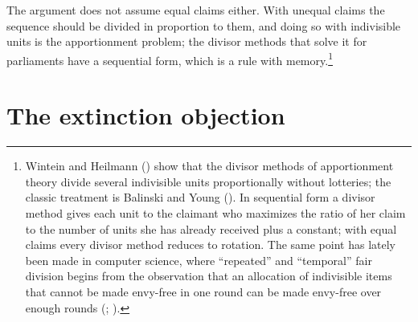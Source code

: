 \documentclass[
  11pt,
  letterpaper,
  DIV=11,
  numbers=noendperiod,
  twoside]{scrartcl}
\begin{document}
The argument does not assume equal claims either. With unequal claims
the sequence should be divided in proportion to them, and doing so with
indivisible units is the apportionment problem; the divisor methods that
solve it for parliaments have a sequential form, which is a rule with
memory.\footnote{Wintein and Heilmann
  () show that the divisor
  methods of apportionment theory divide several indivisible units
  proportionally without lotteries; the classic treatment is Balinski
  and Young (). In sequential form
  a divisor method gives each unit to the claimant who maximizes the
  ratio of her claim to the number of units she has already received
  plus a constant; with equal claims every divisor method reduces to
  rotation. The same point has lately been made in computer science,
  where ``repeated'' and ``temporal'' fair division begins from the
  observation that an allocation of indivisible items that cannot be
  made envy-free in one round can be made envy-free over enough rounds
  (;
  ).}

\section{The extinction objection}\label{sec-extinction}
\end{document}
